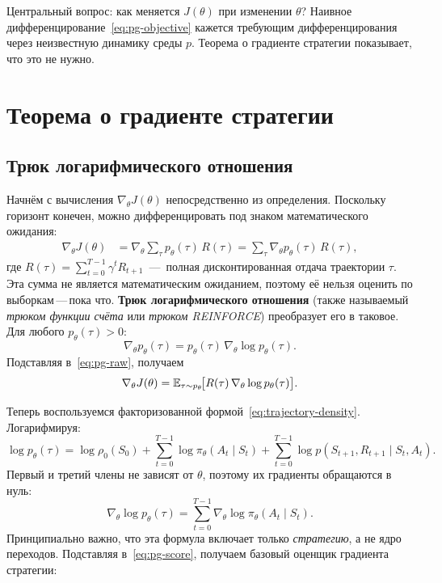 Центральный вопрос: как меняется $J(\theta)$ при изменении $\theta$? Наивное дифференцирование~\eqref{eq:pg-objective} кажется требующим дифференцирования через неизвестную динамику среды $p$. Теорема о градиенте стратегии показывает, что это не нужно.

\section{Теорема о градиенте стратегии}
\label{sec:pg-theorem}


\subsection{Трюк логарифмического отношения}

Начнём с вычисления $\nabla_\theta J(\theta)$ непосредственно из определения. Поскольку горизонт конечен, можно дифференцировать под знаком математического ожидания:
\begin{align}
\nabla_\theta J(\theta)
&= \nabla_\theta \sum_\tau p_\theta(\tau)\, R(\tau)
= \sum_\tau \nabla_\theta p_\theta(\tau)\, R(\tau),
\label{eq:pg-raw}
\end{align}
где $R(\tau) = \sum_{t=0}^{T-1} \gamma^t R_{t+1}$ \,---\, полная дисконтированная отдача траектории $\tau$. Эта сумма не является математическим ожиданием, поэтому её нельзя оценить по выборкам\,---\,пока что. \textbf{Трюк логарифмического отношения} (также называемый \emph{трюком функции счёта} или \emph{трюком REINFORCE}) преобразует его в таковое. Для любого $p_\theta(\tau) > 0$:
\begin{equation}
\label{eq:log-derivative}
\nabla_\theta p_\theta(\tau) = p_\theta(\tau)\, \nabla_\theta \log p_\theta(\tau).
\end{equation}
Подставляя в~\eqref{eq:pg-raw}, получаем
\begin{equation}
\label{eq:pg-score}
\nabla_\theta J(\theta) = \operatorname{\mathbb{E}}_{\tau \sim p_\theta}\!\bigl[R(\tau)\, \nabla_\theta \log p_\theta(\tau)\bigr].
\end{equation}

Теперь воспользуемся факторизованной формой~\eqref{eq:trajectory-density}. Логарифмируя:
\[
\log p_\theta(\tau) = \log \rho_0(S_0) + \sum_{t=0}^{T-1} \log \pi_\theta(A_t \mid S_t) + \sum_{t=0}^{T-1} \log p(S_{t+1}, R_{t+1} \mid S_t, A_t).
\]
Первый и третий члены не зависят от $\theta$, поэтому их градиенты обращаются в нуль:
\begin{equation}
\label{eq:log-traj-grad}
\nabla_\theta \log p_\theta(\tau) = \sum_{t=0}^{T-1} \nabla_\theta \log \pi_\theta(A_t \mid S_t).
\end{equation}
Принципиально важно, что эта формула включает только \emph{стратегию}, а не ядро переходов. Подставляя в~\eqref{eq:pg-score}, получаем базовый оценщик градиента стратегии:

